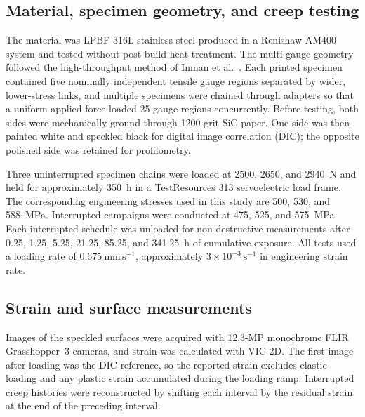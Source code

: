 \documentclass[final,12pt]{cas-sc}
\begin{document}
\iffalse

\subsection{Material, specimen geometry, and creep testing}

The material was LPBF 316L stainless steel produced in a Renishaw AM400 system and tested without post-build heat treatment. The multi-gauge geometry followed the high-throughput method of Inman et al.~\cite{inman2025stochastic}. Each printed specimen contained five nominally independent tensile gauge regions separated by wider, lower-stress links, and multiple specimens were chained through adapters so that a uniform applied force loaded 25 gauge regions concurrently. Before testing, both sides were mechanically ground through 1200-grit SiC paper. One side was then painted white and speckled black for digital image correlation (DIC); the opposite polished side was retained for profilometry.

Three uninterrupted specimen chains were loaded at 2500, 2650, and 2940~N and held for approximately 350~h in a TestResources 313 servoelectric load frame. The corresponding engineering stresses used in this study are 500, 530, and 588~MPa. Interrupted campaigns were conducted at 475, 525, and 575~MPa. Each interrupted schedule was unloaded for non-destructive measurements after 0.25, 1.25, 5.25, 21.25, 85.25, and 341.25~h of cumulative exposure. All tests used a loading rate of $0.675~\mathrm{mm\,s^{-1}}$, approximately $3\times10^{-3}~\mathrm{s^{-1}}$ in engineering strain rate.

\subsection{Strain and surface measurements}

Images of the speckled surfaces were acquired with 12.3-MP monochrome FLIR Grasshopper~3 cameras, and strain was calculated with VIC-2D. The first image after loading was the DIC reference, so the reported strain excludes elastic loading and any plastic strain accumulated during the loading ramp. Interrupted creep histories were reconstructed by shifting each interval by the residual strain at the end of the preceding interval.
\end{document}
